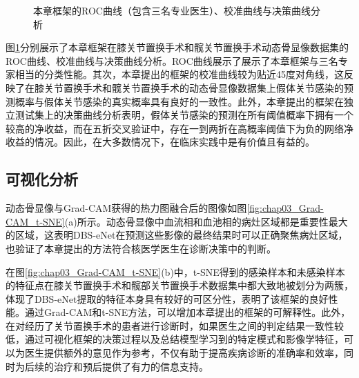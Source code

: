 \begin{figure}[htbp]
  \newline
  \caption{本章框架的ROC曲线（包含三名专业医生）、校准曲线与决策曲线分析}
  \label{fig:chap03_ROC_CC_DAC}
\end{figure}

图\ref{fig:chap03_ROC_CC_DAC}分别展示了本章框架在膝关节置换手术和髋关节置换手术动态骨显像数据集的ROC曲线、校准曲线与决策曲线分析。ROC曲线展示了展示了本章框架与三名专家相当的分类性能。其次，本章提出的框架的校准曲线较为贴近45度对角线，这反映了在膝关节置换手术和髋关节置换手术的动态骨显像数据集上假体关节感染的预测概率与假体关节感染的真实概率具有良好的一致性。此外，本章提出的框架在独立测试集上的决策曲线分析表明，假体关节感染的预测在所有阈值概率下拥有一个较高的净收益，而在五折交叉验证中，存在一到两折在高概率阈值下为负的网络净收益的情况。因此，在大多数情况下，在临床实践中是有价值且有益的。



\subsection{可视化分析}

动态骨显像与Grad-CAM获得的热力图融合后的图像如图\ref{fig:chap03_Grad-CAM_t-SNE}(a)所示。动态骨显像中血流相和血池相的病灶区域都是重要性最大的区域，这表明DBS-eNet在预测这些影像的最终结果时可以正确聚焦病灶区域，也验证了本章提出的方法符合核医学医生在诊断决策中的判断。

在图\ref{fig:chap03_Grad-CAM_t-SNE}(b)中，t-SNE得到的感染样本和未感染样本的特征点在膝关节置换手术和髋部关节置换手术数据集中都大致地被划分为两簇，体现了DBS-eNet提取的特征本身具有较好的可区分性，表明了该框架的良好性能。通过Grad-CAM和t-SNE方法，可以增加本章提出的框架的可解释性。此外，在对经历了关节置换手术的患者进行诊断时，如果医生之间的判定结果一致性较低，通过可视化框架的决策过程以及总结模型学习到的特定模式和影像学特征，可以为医生提供额外的意见作为参考，不仅有助于提高疾病诊断的准确率和效率，同时为后续的治疗和预后提供了有力的信息支持。


